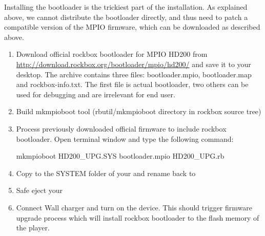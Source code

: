 
  Installing the bootloader is the trickiest part of the installation.
  As explained above, we cannot distribute the bootloader directly, and
  thus need to patch a compatible version of the MPIO firmware, which
  can be downloaded as described above.


\begin{enumerate}
   \item Download official rockbox bootloader for MPIO HD200 from
   \url {http://download.rockbox.org/bootloader/mpio/hd200/}
   and save it to your desktop. The archive contains three files: bootloader.mpio, 
   bootloader.map and rockbox-info.txt. The first file is actual bootloader, two
   others can be used for debugging and are irrelevant for end user.
   \item Build mkmpioboot tool (rbutil/mkmpioboot directory in rockbox source tree)
   \item Process previously downloaded official firmware to include rockbox bootloader.
   Open terminal window and type the following command:
     \begin{code}
       mkmpioboot HD200_UPG.SYS bootloader.mpio HD200_UPG.rb
     \end{code}
   \item Copy  to the SYSTEM folder of your \dap{} and rename back to
   \item Safe eject your \dap{}
   \item Connect Wall charger and turn on the device. This should trigger firmware
   upgrade process which will install rockbox bootloader to the flash memory of the
   player.
\end{enumerate}
